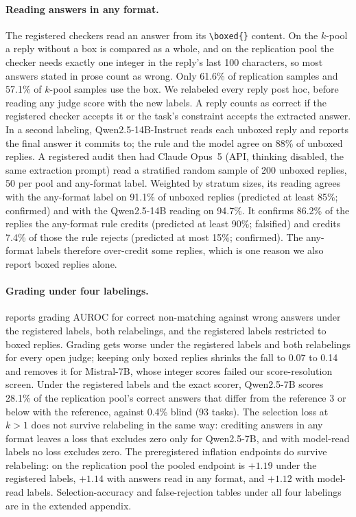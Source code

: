 \paragraph{Reading answers in any format.}
The registered checkers read an answer from its \texttt{\textbackslash boxed\{\}} content. On the $k$-pool a reply without a box is compared as a whole, and on the replication pool the checker needs exactly one integer in the reply's last 100 characters, so most answers stated in prose count as wrong. Only 61.6\% of replication samples and 57.1\% of $k$-pool samples use the box.
We relabeled every reply post hoc, before reading any judge score with the new labels. A reply counts as correct if the registered checker accepts it or the task's constraint accepts the extracted answer. In a second labeling, Qwen2.5-14B-Instruct reads each unboxed reply and reports the final answer it commits to; the rule and the model agree on 88\% of unboxed replies. A registered audit then had Claude Opus~5 (API, thinking disabled, the same extraction prompt) read a stratified random sample of 200 unboxed replies, 50 per pool and any-format label. Weighted by stratum sizes, its reading agrees with the any-format label on 91.1\% of unboxed replies (predicted at least 85\%; confirmed) and with the Qwen2.5-14B reading on 94.7\%. It confirms 86.2\% of the replies the any-format rule credits (predicted at least 90\%; falsified) and credits 7.4\% of those the rule rejects (predicted at most 15\%; confirmed). The any-format labels therefore over-credit some replies, which is one reason we also report boxed replies alone.

\paragraph{Grading under four labelings.}
 reports grading AUROC for correct non-matching against wrong answers under the registered labels, both relabelings, and the registered labels restricted to boxed replies. Grading gets worse under the registered labels and both relabelings for every open judge; keeping only boxed replies shrinks the fall to 0.07 to 0.14 and removes it for Mistral-7B, whose integer scores failed our score-resolution screen. Under the registered labels and the exact scorer, Qwen2.5-7B scores 28.1\% of the replication pool's correct answers that differ from the reference 3 or below with the reference, against 0.4\% blind (93 tasks).\pre{} The selection loss at $k{>}1$ does not survive relabeling in the same way: crediting answers in any format leaves a loss that excludes zero only for Qwen2.5-7B, and with model-read labels no loss excludes zero. The preregistered inflation endpoints do survive relabeling: on the replication pool the pooled endpoint is $+1.19$ under the registered labels, $+1.14$ with answers read in any format, and $+1.12$ with model-read labels.\ph{} Selection-accuracy and false-rejection tables under all four labelings are in the extended appendix.

